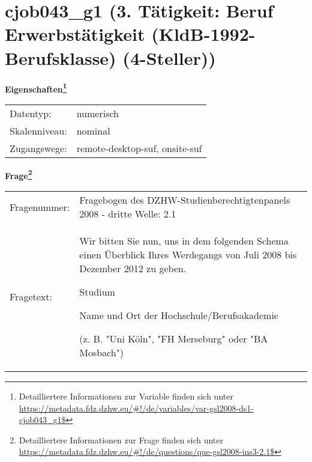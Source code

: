 
    \setcounter{footnote}{0}

    \vspace*{-1.8cm}
	\section{cjob043\_g1 (3. Tätigkeit: Beruf Erwerbstätigkeit (KldB-1992-Berufsklasse) (4-Steller))}
	\label{section:cjob043_g1}



    \vspace*{0.5cm}
    \noindent\textbf{Eigenschaften\footnote{Detailliertere Informationen zur Variable finden sich unter
		\url{https://metadata.fdz.dzhw.eu/\#!/de/variables/var-gsl2008-ds1-cjob043_g1$}}}\\
	\begin{tabularx}{\hsize}{@{}lX}
	Datentyp: & numerisch \\
	Skalenniveau: & nominal \\
	Zugangswege: &
	  remote-desktop-suf, 
	  onsite-suf
 \\
    \end{tabularx}



				\vspace*{0.5cm}
                \noindent\textbf{Frage\footnote{Detailliertere Informationen zur Frage finden sich unter
		              \url{https://metadata.fdz.dzhw.eu/\#!/de/questions/que-gsl2008-ins3-2.1$}}}\\
				\begin{tabularx}{\hsize}{@{}lX}
					Fragenummer: &
					  Fragebogen des DZHW-Studienberechtigtenpanels 2008 - dritte Welle:
					  2.1
 \\
					Fragetext: & Wir bitten Sie nun, uns in dem folgenden Schema einen Überblick Ihres Werdegangs von Juli 2008 bis Dezember 2012 zu geben.\par  Studium\par  Name und Ort der Hochschule/Berufsakademie\par  (z. B. "Uni Köln", "FH Merseburg" oder "BA Mosbach") \\
				\end{tabularx}





